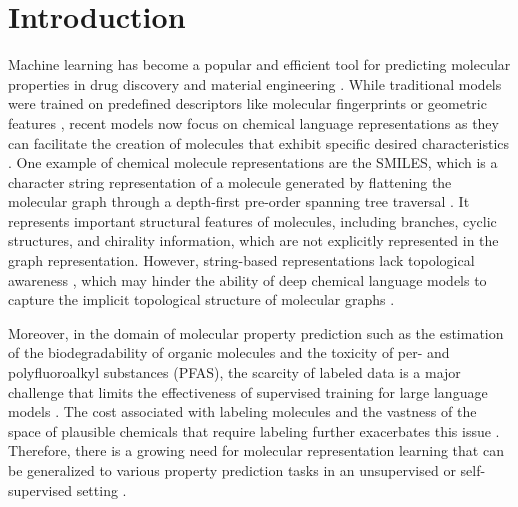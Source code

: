 \documentclass{article}
\begin{document}
\section{Introduction}
Machine learning has become a popular and efficient tool for predicting molecular properties in drug discovery and material engineering \cite{butler2018machine}. 
While traditional models were trained on predefined descriptors like molecular fingerprints or geometric features \cite{pattanaik2020molecular}, recent models now focus on chemical language representations as they can facilitate the creation of molecules that exhibit specific desired characteristics \cite{born2023regression}. 
One example of chemical molecule representations are the SMILES, which is a character string representation of a molecule generated by flattening the molecular graph through a depth-first pre-order spanning tree traversal \cite{Weininger1988SMILESAC}. 
It represents important structural features of molecules, including branches, cyclic structures, and chirality information, which are not explicitly represented in the graph representation. 
However, string-based representations lack topological awareness \cite{moriwaki2018mordred}, which may hinder the ability of deep chemical language models to capture the implicit topological structure of molecular graphs \cite{shen2021out}. 

Moreover, in the domain of molecular property prediction such as the estimation of the biodegradability of organic molecules and the toxicity of per- and polyfluoroalkyl substances (PFAS), the scarcity of labeled data \cite{kirkpatrick2004chemical} is a major challenge that limits the effectiveness of supervised training for large language models \cite{wang2019smiles}. 
The cost associated with labeling molecules and the vastness of the space of plausible chemicals that require labeling further exacerbates this issue \cite{von2020retrospective}. 
Therefore, there is a growing need for molecular representation learning that can be generalized to various property prediction tasks in an unsupervised or self-supervised setting \cite{zhang2022pushing}.
\end{document}
